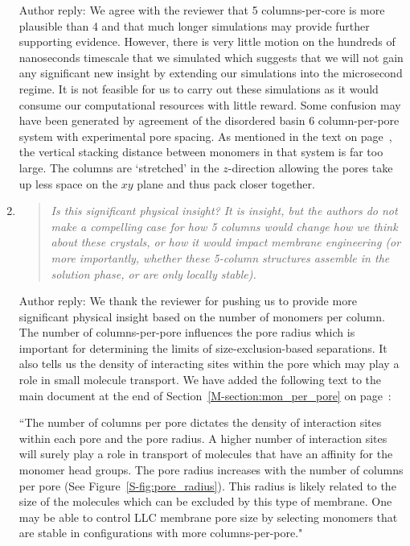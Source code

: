 \documentclass{article}
\begin{document}
\begin{enumerate}
    Author reply: We agree with the reviewer that 5 columns-per-core is more
    plausible than 4 and that much longer simulations may provide further
    supporting evidence. However, there is very little motion on the hundreds of
    nanoseconds timescale that we simulated which suggests that we will not gain
    any significant new insight by extending our simulations into the microsecond
    regime. It is not feasible for us to carry out these simulations as it would
    consume our computational resources with little reward.
    Some confusion may have been generated by agreement of the disordered basin
    6 column-per-pore system with experimental pore spacing. As mentioned in the
    text on page~\pageref{M-6colperpore}, the vertical stacking distance between 
    monomers in that system is far too large. The columns are `stretched' in the
    $z$-direction allowing the pores take up less space on the $xy$ plane and 
    thus pack closer together.  
    
    \item \begin{quote}    
    \textit{Is this significant physical insight? It is insight, but the
	    authors do not make a compelling case for how 5 columns would change how we
	    think about these crystals, or how it would impact membrane engineering (or
	    more importantly, whether these 5-column structures assemble in the solution
	    phase, or are only locally stable).}
    \end{quote}
    
    Author reply: We thank the reviewer for pushing us to provide more
    significant physical insight based on the number of monomers per column. The
    number of columns-per-pore influences the pore radius which is important for
    determining the limits of size-exclusion-based separations. It also tells us
    the density of interacting sites within the pore which may play a role in small
    molecule transport. We have added the following text to the main document at
    the end of Section~\ref{M-section:mon_per_pore} on page~\pageref{M-addition:pore_radius}:
    
    ``The number of columns per pore dictates the density of interaction sites
    within each pore and the pore radius. A higher number of interaction sites will
    surely play a role in transport of molecules that have an affinity for the
    monomer head groups.  The pore radius increases with the number of columns per
    pore (See Figure~\ref{S-fig:pore_radius}). This radius is likely related to the
    size of the molecules which can be excluded by this type of membrane. One may be
    able to control LLC membrane pore size by selecting monomers that are stable in
    configurations with more columns-per-pore."
    

\end{enumerate}
\end{document}
